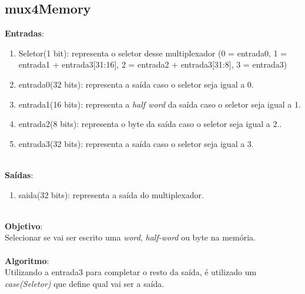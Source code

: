 \documentclass{article}
\begin{document}
    \newpage
    \subsection{mux4Memory}
    \textbf{Entradas}:
    \begin{enumerate}
        \item Seletor(1 bit): representa o seletor desse multiplexador (0 = entrada0, 1 = entrada1 + entrada3[31:16], 2 = entrada2 + entrada3[31:8], 3 = entrada3)
        \item entrada0(32 bits): representa a saída caso o seletor seja igual a 0.
        \item entrada1(16 bits): representa a {\it half word} da saída caso o seletor seja igual a 1.
        \item entrada2(8 bits): representa o byte da saída caso o seletor seja igual a 2..
        \item entrada3(32 bits): representa a saída caso o seletor seja igual a 3.\\
    \end{enumerate}
    \\
    \textbf{Saídas}:
    \begin{enumerate}
        \item saida(32 bits): representa a saída do multiplexador.\\
    \end{enumerate}
    \\
    \textbf{Objetivo}:\\
    Selecionar se vai ser escrito uma {\it word}, {\it half-word} ou byte na memória.
    \\
    \\
    \textbf{Algoritmo}:\\
    Utilizando a entrada3 para completar o resto da saída, é utilizado um {\it case(Seletor)} que define qual vai ser a saída.
    \\
\end{document}
